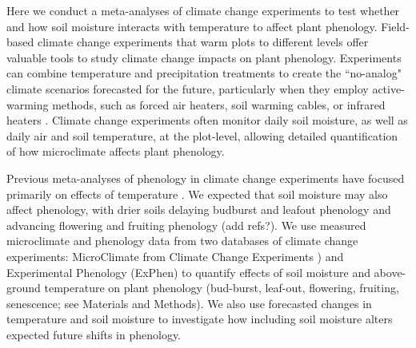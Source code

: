 \documentclass{article}
\begin{document}
\par Here we conduct a meta-analyses of climate change experiments to test whether and how soil moisture interacts with temperature to affect plant phenology. Field-based climate change experiments that warm plots to different levels offer valuable tools to study climate change impacts on plant phenology. Experiments can combine temperature and precipitation treatments to create the ``no-analog" climate scenarios forecasted for the future, particularly when they employ active-warming methods, such as forced air heaters, soil warming cables, or infrared heaters \citep{shaver2000,williams2007b,aronson2009}. Climate change experiments often monitor daily soil moisture, as well as daily air and soil temperature, at the plot-level, allowing detailed quantification of how microclimate affects plant phenology. 
\par Previous meta-analyses of phenology in climate change experiments have focused primarily on effects of temperature \citep[e.g.,][]{wolkovich2012}. We expected that soil moisture may also affect phenology, with drier soils delaying budburst and leafout phenology and advancing flowering and fruiting phenology (add refs?).  We use measured microclimate and phenology data from two databases of climate change experiments: MicroClimate from Climate Change Experiments \citep[MC3E, ][]{ettinger2018}) and Experimental Phenology (ExPhen)  to quantify effects of soil moisture and above-ground temperature on plant phenology (bud-burst, leaf-out, flowering, fruiting, senescence; see Materials and Methods). We also use forecasted changes in temperature and soil moisture to investigate how including soil moisture alters expected future shifts in phenology. 
\end{document}
